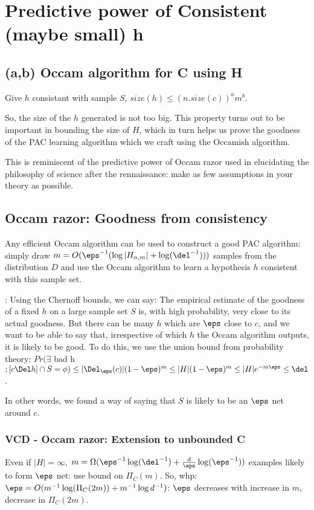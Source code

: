 \documentclass[oneside, article]{memoir}
\begin{document}
\section{Predictive power of Consistent (maybe small) h}
\subsection{(a,b) Occam algorithm for C using H}
Give $h$ consistant with sample $S$, $size(h) \leq (n .size(c))^{a}m^{b}$.

So, the size of the $h$ generated is not too big. This property turns out to be important in bounding the size of $H$, which in turn helps us prove the goodness of the PAC learning algorithm which we craft using the Occamish algorithm.

This is reminiscent of the predictive power of Occam razor used in elucidating the philosophy of science after the rennaissance: make as few assumptions in your theory as possible.

\subsection{Occam razor: Goodness from consistency}
Any efficient Occam algorithm can be used to construct a good PAC algorithm: simply draw $m = O(\eps^{-1}(\log |H_{n,m}| + \log(\del^{-1})))$ samples from the distribution $D$ and use the Occam algorithm to learn a hypothesis $h$ consistent with this sample set.

\proof: Using the Chernoff bounds, we can say: The empirical estimate of the goodness of a fixed $h$ on a large sample set $S$ is, with high probability, very close to its actual goodness. But there can be many $h$ which are $\eps$ close to $c$, and we want to be able to say that, irrespective of which $h$ the Occam algorithm outputs, it is likely to be good. To do this, we use the union bound from probability theory: $Pr(\exists $ bad h$; [c \Del h] \cap S = \phi) \leq |\Del_{\eps}(c)|(1-\eps)^{m} \leq |H|(1-\eps)^{m} \leq |H|e^{-m\eps} \leq \del$.

In other words, we found a way of saying that $S$ is likely to be an $\eps$ net around $c$.

\subsubsection{VCD - Occam razor: Extension to unbounded C}
Even if $|H| = \infty$, $m = \Omega(\eps^{-1}\log(\del^{-1}) + \frac{d}{\eps}\log(\eps^{-1}))$ examples likely to form $\eps$ net: use bound on $\Pi_{C}(m)$. So, whp:\\
$\eps = O(m^{-1}\log(\Pi_{C}(2m)) + m^{-1}\log d^{-1})$: $\eps$ decreases with increase in $m$, decrease in $\Pi_{C}(2m)$.
\end{document}
